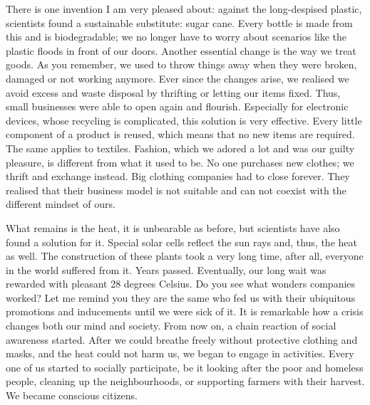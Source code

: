 \documentclass[]{book}
\begin{document}
There is one invention I am very pleased about: against the long-despised plastic, scientists found a sustainable substitute: sugar cane. Every bottle is made from this and is biodegradable; we no longer have to worry about scenarios like the plastic floods in front of our doors. Another essential change is the way we treat goods. As you remember, we used to throw things away when they were broken, damaged or not working anymore. Ever since the changes arise, we realised we avoid excess and waste disposal by thrifting or letting our items fixed. Thus, small businesses were able to open again and flourish. Especially for electronic devices, whose recycling is complicated, this solution is very effective. Every little component of a product is reused, which means that no new items are required. The same applies to textiles. Fashion, which we adored a lot and was our guilty pleasure, is different from what it used to be. No one purchases new clothes; we thrift and exchange instead. Big clothing companies had to close forever. They realised that their business model is not suitable and can not coexist with the different mindset of ours.

What remains is the heat, it is unbearable as before, but scientists have also found a solution for it. Special solar cells reflect the sun rays and, thus, the heat as well. The construction of these plants took a very long time, after all, everyone in the world suffered from it. Years passed. Eventually, our long wait was rewarded with pleasant 28 degrees Celsius. Do you see what wonders companies worked? Let me remind you they are the same who fed us with their ubiquitous promotions and inducements until we were sick of it. It is remarkable how a crisis changes both our mind and society. From now on, a chain reaction of social awareness started. After we could breathe freely without protective clothing and masks, and the heat could not harm us, we began to engage in activities. Every one of us started to socially participate, be it looking after the poor and homeless people, cleaning up the neighbourhoods, or supporting farmers with their harvest. We became conscious citizens.
\end{document}
